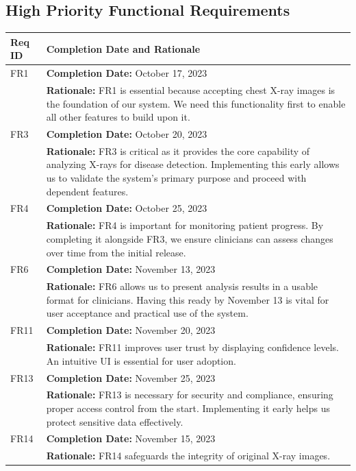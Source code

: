 \documentclass[12pt]{article}
\begin{document}
\subsection{High Priority Functional Requirements}
\begin{table}[H]
  \label{TblHighPriorityFRs}
  \begin{tabular}{p{}|p{}}
  \toprule
  \textbf{Req ID} & \textbf{Completion Date and Rationale} \\
  \midrule
  FR1 & \textbf{Completion Date:} October 17, 2023\\
      & \textbf{Rationale:} FR1 is essential because accepting chest X-ray images is the foundation of our system. We need this functionality first to enable all other features to build upon it. \\
  \midrule
  FR3 & \textbf{Completion Date:} October 20, 2023\\
      & \textbf{Rationale:} FR3 is critical as it provides the core capability of analyzing X-rays for disease detection. Implementing this early allows us to validate the system's primary purpose and proceed with dependent features. \\
  \midrule
  FR4 & \textbf{Completion Date:} October 25, 2023\\
      & \textbf{Rationale:} FR4 is important for monitoring patient progress. By completing it alongside FR3, we ensure clinicians can assess changes over time from the initial release. \\
  \midrule
  FR6 & \textbf{Completion Date:} November 13, 2023\\
      & \textbf{Rationale:} FR6 allows us to present analysis results in a usable format for clinicians. Having this ready by November 13 is vital for user acceptance and practical use of the system. \\
  \midrule
  FR11 & \textbf{Completion Date:} November 20, 2023\\
       & \textbf{Rationale:} FR11 improves user trust by displaying confidence levels. An intuitive UI is essential for user adoption. \\
  \midrule
  FR13 & \textbf{Completion Date:} November 25, 2023\\
       & \textbf{Rationale:} FR13 is necessary for security and compliance, ensuring proper access control from the start. Implementing it early helps us protect sensitive data effectively. \\
  \midrule
  FR14 & \textbf{Completion Date:} November 15, 2023\\
       & \textbf{Rationale:} FR14 safeguards the integrity of original X-ray images.\\
  \bottomrule
  \end{tabular}
  \end{table}
\end{document}
